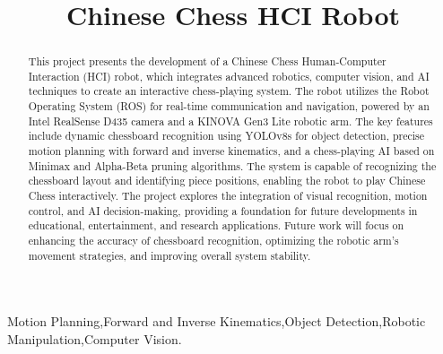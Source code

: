 \documentclass[conference]{IEEEtran}
\begin{document}
\title{Chinese Chess HCI Robot\\}

\author{
	\and
	\and
}


\maketitle

\begin{abstract}
This project presents the development of a Chinese Chess Human-Computer Interaction (HCI) robot, which integrates advanced robotics, computer vision, and AI techniques to create an interactive chess-playing system. The robot utilizes the Robot Operating System (ROS) for real-time communication and navigation, powered by an Intel RealSense D435 camera and a KINOVA Gen3 Lite robotic arm. The key features include dynamic chessboard recognition using YOLOv8s for object detection, precise motion planning with forward and inverse kinematics, and a chess-playing AI based on Minimax and Alpha-Beta pruning algorithms. The system is capable of recognizing the chessboard layout and identifying piece positions, enabling the robot to play Chinese Chess interactively. The project explores the integration of visual recognition, motion control, and AI decision-making, providing a foundation for future developments in educational, entertainment, and research applications. Future work will focus on enhancing the accuracy of chessboard recognition, optimizing the robotic arm's movement strategies, and improving overall system stability.
\end{abstract}

\begin{IEEEkeywords}
Motion Planning,Forward and Inverse Kinematics,Object Detection,Robotic Manipulation,Computer Vision.
\end{IEEEkeywords}
\end{document}
